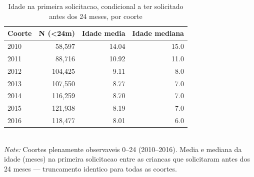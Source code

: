 \begin{table}[htbp]\centering
\caption{Idade na primeira solicitacao, condicional a ter solicitado antes dos 24 meses, por coorte}
\label{tab:S2c_cond24}
\small
\begin{tabular}{lrrr}
\toprule
Coorte & N (\textless 24m) & Idade media & Idade mediana \\
\midrule
2010 & 58,597 & 14.04 & 15.0 \\
2011 & 88,716 & 10.92 & 11.0 \\
2012 & 104,425 & 9.11 & 8.0 \\
2013 & 107,550 & 8.77 & 7.0 \\
2014 & 116,259 & 8.70 & 7.0 \\
2015 & 121,938 & 8.19 & 7.0 \\
2016 & 118,477 & 8.01 & 6.0 \\
\bottomrule
\end{tabular}
\\[3pt]{\footnotesize \textit{Note:} Coortes plenamente observaveis 0--24 (2010--2016). Media e mediana da idade (meses) na primeira solicitacao entre as criancas que solicitaram antes dos 24 meses --- truncamento identico para todas as coortes.}
\end{table}
